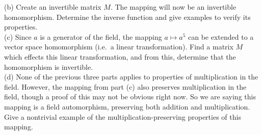 %
(b) Create an invertible matrix $M$.  The mapping will now be an invertible homomorphism.  Determine the inverse function and give examples to verify its properties.\\
%
(c)   Since $a$ is a generator of the field, the mapping $a\mapsto a^5$ can be extended to a vector space homomorphism (i.e.\ a linear transformation). Find a matrix $M$ which effects this linear transformation, and from this, determine that the homomorphism is invertible.\\
%
(d)  None of the previous three parts applies to properties of multiplication in the field.  However, the mapping from part (c) also preserves multiplication in the field, though a proof of this may not be obvious right now.  So we are saying this mapping is a field automorphism, preserving both addition and multiplication.  Give a nontrivial example of the multiplication-preserving properties of this mapping.
\begin{sageverbatim}\end{sageverbatim}
%
